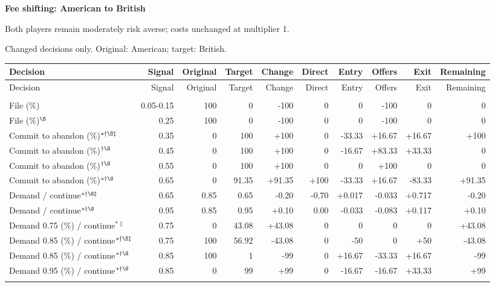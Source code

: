 \documentclass[10pt]{article}
\begin{document}
\clearpage
{\large\bfseries Fee shifting: American to British}\par
Both players remain moderately risk averse; costs unchanged at multiplier 1.\par
{\small Changed decisions only. Original: American; target: British.}\par
{\small\setlength{\tabcolsep}{3pt}\begin{longtable}{@{}>{\raggedright\arraybackslash}p{1.65in}rrrrrrrrr@{}}
\toprule Decision & Signal & Original & Target & Change & Direct & Entry & Offers & Exit & Remaining \\\midrule\endfirsthead
\toprule Decision & Signal & Original & Target & Change & Direct & Entry & Offers & Exit & Remaining \\\midrule\endhead
\bottomrule\endfoot
\multicolumn{10}{@{}l}{\textbf{Plaintiff}}\\
File (\%) & 0.05-0.15 & 100 & 0 & -100 & 0 & 0 & -100 & 0 & 0\\
File (\%)$^{\S}$ & 0.25 & 100 & 0 & -100 & 0 & 0 & -100 & 0 & 0\\
Commit to abandon (\%)$^{*\dagger\S\ddagger}$ & 0.35 & 0 & 100 & +100 & 0 & -33.33 & +16.67 & +16.67 & +100\\
Commit to abandon (\%)$^{\dagger\S}$ & 0.45 & 0 & 100 & +100 & 0 & -16.67 & +83.33 & +33.33 & 0\\
Commit to abandon (\%)$^{\dagger\S}$ & 0.55 & 0 & 100 & +100 & 0 & 0 & +100 & 0 & 0\\
Commit to abandon (\%)$^{*\dagger\S}$ & 0.65 & 0 & 91.35 & +91.35 & +100 & -33.33 & +16.67 & -83.33 & +91.35\\
Demand / continue$^{*\dagger\S\ddagger}$ & 0.65 & 0.85 & 0.65 & -0.20 & -0.70 & +0.017 & -0.033 & +0.717 & -0.20\\
Demand / continue$^{*\dagger\S}$ & 0.95 & 0.85 & 0.95 & +0.10 & 0.00 & -0.033 & -0.083 & +0.117 & +0.10\\
Demand 0.75 (\%) / continue$^{*\ddagger}$ & 0.75 & 0 & 43.08 & +43.08 & 0 & 0 & 0 & 0 & +43.08\\
Demand 0.85 (\%) / continue$^{*\dagger\S\ddagger}$ & 0.75 & 100 & 56.92 & -43.08 & 0 & -50 & 0 & +50 & -43.08\\
Demand 0.85 (\%) / continue$^{*\dagger\S}$ & 0.85 & 100 & 1 & -99 & 0 & +16.67 & -33.33 & +16.67 & -99\\
Demand 0.95 (\%) / continue$^{*\dagger\S}$ & 0.85 & 0 & 99 & +99 & 0 & -16.67 & -16.67 & +33.33 & +99\\
\multicolumn{10}{@{}l}{\textbf{Defendant}}\\

\end{longtable}}
\end{document}
